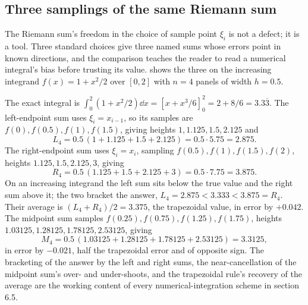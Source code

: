 \subsection{Three samplings of the same Riemann sum}

The Riemann sum's freedom in the choice of sample point $\xi_{i}$ is
not a defect; it is a tool. Three standard choices give three named
sums whose errors point in known directions, and the comparison
teaches the reader to read a numerical integral's bias before
trusting its value.
 shows the three on the increasing
integrand $f(x) = 1 + x^{2}/2$ over $[0,2]$ with $n = 4$ panels of
width $h = 0.5$.



The exact integral is
$\int_{0}^{2}(1 + x^{2}/2)\dd x = [x + x^{3}/6]_{0}^{2} = 2 + 8/6 =
3.3\overline{3}$. The left-endpoint sum uses
$\xi_{i} = x_{i-1}$, so its samples are $f(0), f(0.5), f(1),
f(1.5)$, giving heights $1, 1.125, 1.5, 2.125$ and
\[
L_{4} = 0.5\,(1 + 1.125 + 1.5 + 2.125) = 0.5 \cdot 5.75 = 2.875.
\]
The right-endpoint sum uses $\xi_{i} = x_{i}$, sampling $f(0.5),
f(1), f(1.5), f(2)$, heights $1.125, 1.5, 2.125, 3$, giving
\[
R_{4} = 0.5\,(1.125 + 1.5 + 2.125 + 3) = 0.5 \cdot 7.75 = 3.875.
\]
On an increasing integrand the left sum sits below the true value
and the right sum above it; the two bracket the answer,
$L_{4} = 2.875 < 3.333 < 3.875 = R_{4}$. Their average is
$(L_{4} + R_{4})/2 = 3.375$, the trapezoidal value, in error by
$+0.042$. The midpoint sum samples $f(0.25), f(0.75), f(1.25),
f(1.75)$, heights $1.03125, 1.28125, 1.78125, 2.53125$, giving
\[
M_{4} = 0.5\,(1.03125 + 1.28125 + 1.78125 + 2.53125) = 3.3125,
\]
in error by $-0.021$, half the trapezoidal error and of opposite
sign. The bracketing of the answer by the left and right sums, the
near-cancellation of the midpoint sum's over- and under-shoots, and
the trapezoidal rule's recovery of the average are the working
content of every numerical-integration scheme in section 6.5.

